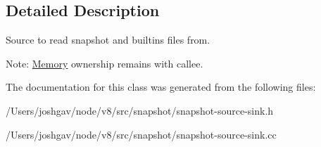 \subsection{Detailed Description}
Source to read snapshot and builtins files from.

Note\+: \hyperlink{classv8_1_1internal_1_1_memory}{Memory} ownership remains with callee. 

The documentation for this class was generated from the following files\+:\begin{DoxyCompactItemize}
\item 
/\+Users/joshgav/node/v8/src/snapshot/snapshot-\/source-\/sink.\+h\item 
/\+Users/joshgav/node/v8/src/snapshot/snapshot-\/source-\/sink.\+cc\end{DoxyCompactItemize}
